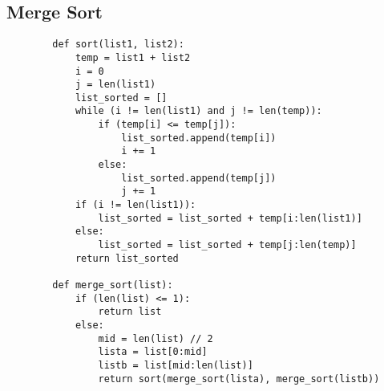    \newpage





\subsection{ Merge Sort }

    \begin{lstlisting}
        def sort(list1, list2):
            temp = list1 + list2
            i = 0
            j = len(list1)
            list_sorted = []
            while (i != len(list1) and j != len(temp)):
                if (temp[i] <= temp[j]):
                    list_sorted.append(temp[i])
                    i += 1
                else:
                    list_sorted.append(temp[j])
                    j += 1
            if (i != len(list1)):
                list_sorted = list_sorted + temp[i:len(list1)]
            else:
                list_sorted = list_sorted + temp[j:len(temp)]
            return list_sorted

        def merge_sort(list):
            if (len(list) <= 1):
                return list
            else:
                mid = len(list) // 2
                lista = list[0:mid]
                listb = list[mid:len(list)]
                return sort(merge_sort(lista), merge_sort(listb))
    \end{lstlisting}










